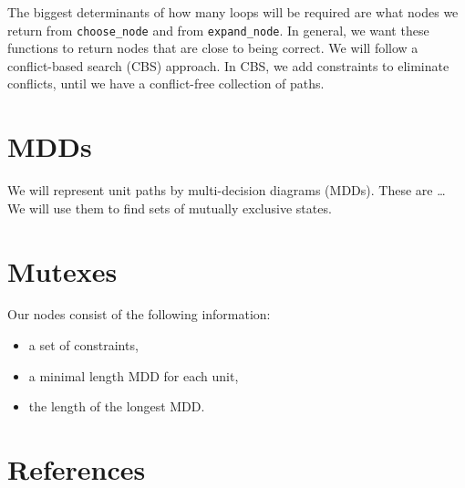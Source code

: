 \documentclass[12pt,letterpaper]{article}
\newcommand*{\code}[1]{\texttt {#1}}
\begin{document}
The biggest determinants of how many loops will be required are
what nodes we return from \code{choose\_node} and from \code{expand\_node}.
In general, we want these functions to return nodes that are close to being correct.
We will follow a conflict-based search (CBS) approach.
In CBS, we add constraints to eliminate conflicts,
until we have a conflict-free collection of paths.

\section{MDDs}

We will represent unit paths by multi-decision diagrams (MDDs).
These are \dots
We will use them to find sets of mutually exclusive states.

\section{Mutexes}

Our nodes consist of the following information:
\begin{itemize}
	\item a set of constraints,
	\item a minimal length MDD for each unit,
	\item the length of the longest MDD.
\end{itemize}

\appendix

\section*{References}

\nocite{*}
\printbibliography
\end{document}
